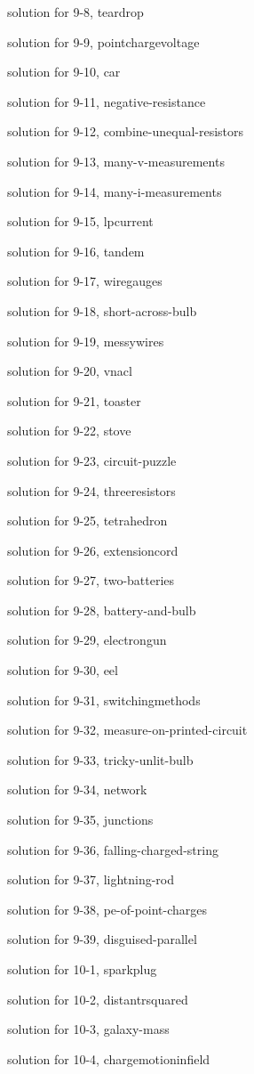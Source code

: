 \documentclass{problems}
\begin{document}
solution for 9-8, teardrop

solution for 9-9, pointchargevoltage

solution for 9-10, car

solution for 9-11, negative-resistance

solution for 9-12, combine-unequal-resistors

solution for 9-13, many-v-measurements

solution for 9-14, many-i-measurements

solution for 9-15, lpcurrent

solution for 9-16, tandem

solution for 9-17, wiregauges

solution for 9-18, short-across-bulb

solution for 9-19, messywires

solution for 9-20, vnacl

solution for 9-21, toaster

solution for 9-22, stove

solution for 9-23, circuit-puzzle

solution for 9-24, threeresistors

solution for 9-25, tetrahedron

solution for 9-26, extensioncord

solution for 9-27, two-batteries

solution for 9-28, battery-and-bulb

solution for 9-29, electrongun

solution for 9-30, eel

solution for 9-31, switchingmethods

solution for 9-32, measure-on-printed-circuit

solution for 9-33, tricky-unlit-bulb

solution for 9-34, network

solution for 9-35, junctions

solution for 9-36, falling-charged-string

solution for 9-37, lightning-rod

solution for 9-38, pe-of-point-charges

solution for 9-39, disguised-parallel

solution for 10-1, sparkplug

solution for 10-2, distantrsquared

solution for 10-3, galaxy-mass

solution for 10-4, chargemotioninfield
\end{document}
